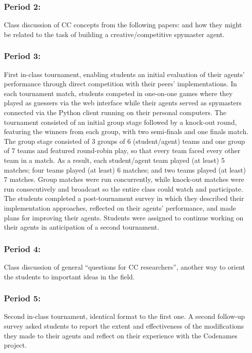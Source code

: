 \documentclass[phd,electronic,oneside,twosidetoc,letterpaper,chaptercenter,parttop,lof]{byumsphd}
\begin{document}
\subsubsection{Period 2:} Class discussion of CC concepts from the following papers: \cite{wiggins2006,ritchie07,ventura2017howto,colton2011,pease2011} and how they might be related to the task of building a creative/competitive spymaster agent.

\subsubsection{Period 3:} First in-class tournament, enabling students an initial evaluation of their agents' performance through direct competition with their peers' implementations. In each tournament match, students competed in one-on-one games where they played as guessers via the web interface while their agents served as spymasters connected via the Python client running on their personal computers. The tournament consisted of an initial group stage followed by a knock-out round, featuring the winners from each group, with two semi-finals and one finals match.  The group stage consisted of  3 groups of 6 (student/agent) teams and one group of 7 teams and featured round-robin play, so that every team faced every other team in a match.  As a result, each student/agent team played (at least) 5 matches; four teams played (at least) 6 matches; and two teams played (at least) 7 matches.  Group matches were run concurrently, while knock-out matches were run consecutively and broadcast so the entire class could watch and participate. The students completed a post-tournament survey in which they described their implementation approaches, reflected on their agents' performance, and made plans for improving their agents. Students were assigned to continue working on their agents in anticipation of a second tournament.

\subsubsection{Period 4:} Class discussion of general “questions for CC researchers”, another way to orient the students to important ideas in the field.

\subsubsection{Period 5:} Second in-class tournament, identical format to the first one. A second follow-up survey asked students to report the extent and effectiveness of the modifications they made to their agents and reflect on their experience with the Codenames project.
\end{document}
